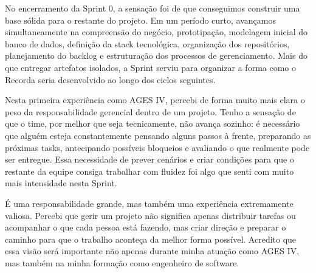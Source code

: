 \indent No encerramento da Sprint 0, a sensação foi de que conseguimos construir uma base sólida para o restante do projeto. Em um período curto, avançamos simultaneamente na compreensão do negócio, prototipação, modelagem inicial do banco de dados, definição da stack tecnológica, organização dos repositórios, planejamento do backlog e estruturação dos processos de gerenciamento. Mais do que entregar artefatos isolados, a Sprint serviu para organizar a forma como o Recorda seria desenvolvido ao longo dos ciclos seguintes.\par

\begin{reflection}
\noindent Nesta primeira experiência como AGES IV, percebi de forma muito mais clara o peso da responsabilidade gerencial dentro de um projeto. Tenho a sensação de que o time, por melhor que seja tecnicamente, não avança sozinho: é necessário que alguém esteja constantemente pensando alguns passos à frente, preparando as próximas tasks, antecipando possíveis bloqueios e avaliando o que realmente pode ser entregue. Essa necessidade de prever cenários e criar condições para que o restante da equipe consiga trabalhar com fluidez foi algo que senti com muito mais intensidade nesta Sprint.\par

\noindent É uma responsabilidade grande, mas também uma experiência extremamente valiosa. Percebi que gerir um projeto não significa apenas distribuir tarefas ou acompanhar o que cada pessoa está fazendo, mas criar direção e preparar o caminho para que o trabalho aconteça da melhor forma possível. Acredito que essa visão será importante não apenas durante minha atuação como AGES IV, mas também na minha formação como engenheiro de software.\par

\end{reflection}

